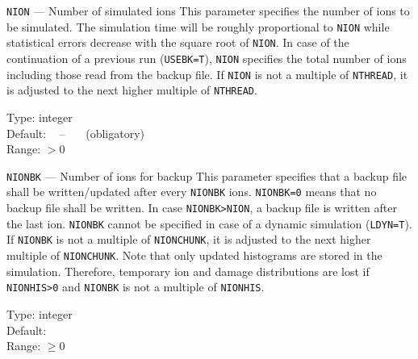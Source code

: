 \begin{keydescription}{\texttt{NION} --- Number of simulated ions}
%
  This parameter specifies the number of ions to be simulated. The
  simulation time will be roughly proportional to \texttt{NION} while
  statistical errors decrease with the square root of \texttt{NION}.
  In case of the continuation of a previous run (\texttt{USEBK=T}),
  \texttt{NION} specifies the total number of ions including those
  read from the backup file. If \texttt{NION} is not a multiple of
  \texttt{NTHREAD}, it is adjusted to the next higher multiple 
  of \texttt{NTHREAD}.
%
  \begin{keytab}
    Type:    \> integer \\
    Default: \> ~ -- ~~~(obligatory) \\
    Range:   \> $> 0$
  \end{keytab}
\end{keydescription}

\begin{keydescription}{\texttt{NIONBK} --- Number of ions for backup}
	This parameter specifies that a backup file shall be written/updated 
	after every	\texttt{NIONBK} ions. \texttt{NIONBK=0} means that no backup 
	file shall be written. In case \texttt{NIONBK>NION}, a backup file is 
	written	after the last ion. \texttt{NIONBK} cannot be specified in case 
	of a dynamic simulation (\texttt{LDYN=T}). If \texttt{NIONBK} is not a
	multiple of \texttt{NIONCHUNK}, it is adjusted to the next higher multiple of
	\texttt{NIONCHUNK}. Note that only updated histograms are stored in the
	simulation. Therefore, temporary ion and damage distributions are lost if
	\texttt{NIONHIS>0} and \texttt{NIONBK} is not a multiple of \texttt{NIONHIS}.
	\begin{keytab}
		Type:    \> integer \\
		Default:   \\
		Range:   \> $\ge 0$
	\end{keytab}
\end{keydescription}

